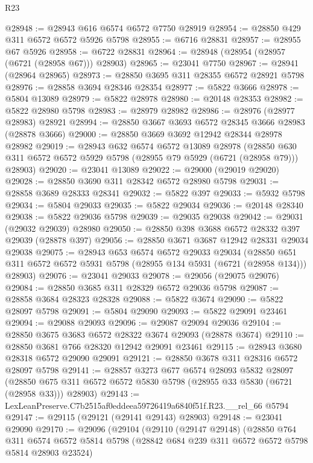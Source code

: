 \begin{lexlean}{R23}
\begin{coremodule}
@28948 := @28943 @616 @6574 @6572 @7750 @28919
@28954 := @28850 @429 @311 @6572 @6572 @5926 @5798
@28955 := @6716 @28831
@28957 := @28955 @67 @5926
@28958 := @6722 @28831
@28964 := @28948 (@28954 (@28957 (@6721 (@28958 @67))) @28903)
@28965 := @23041 @7750
@28967 := @28941 (@28964 @28965)
@28973 := @28850 @3695 @311 @28355 @6572 @28921 @5798
@28976 := @28858 @3694 @28346 @28354
@28977 := @5822 @3666
@28978 := @5804 @13089
@28979 := @5822 @28978
@28980 := @20148 @28353
@28982 := @5822 @28980 @5798
@28983 := @28979 @28982
@28986 := @28976 (@28977 @28983) @28921
@28994 := @28850 @3667 @3693 @6572 @28345 @3666 @28983 (@28878 @3666)
@29000 := @28850 @3669 @3692 @12942 @28344 @28978 @28982
@29019 := @28943
    @632
    @6574
    @6572
    @13089
    @28978
    (@28850 @630 @311 @6572 @6572 @5929 @5798 (@28955 @79 @5929 (@6721 (@28958 @79))) @28903)
@29020 := @23041 @13089
@29022 := @29000 (@29019 @29020)
@29028 := @28850 @3690 @311 @28342 @6572 @28980 @5798
@29031 := @28858 @3689 @28333 @28341
@29032 := @5822 @397
@29033 := @5932 @5798
@29034 := @5804 @29033
@29035 := @5822 @29034
@29036 := @20148 @28340
@29038 := @5822 @29036 @5798
@29039 := @29035 @29038
@29042 := @29031 (@29032 @29039) @28980
@29050 := @28850 @398 @3688 @6572 @28332 @397 @29039 (@28878 @397)
@29056 := @28850 @3671 @3687 @12942 @28331 @29034 @29038
@29075 := @28943
    @653
    @6574
    @6572
    @29033
    @29034
    (@28850 @651 @311 @6572 @6572 @5931 @5798 (@28955 @134 @5931 (@6721 (@28958 @134))) @28903)
@29076 := @23041 @29033
@29078 := @29056 (@29075 @29076)
@29084 := @28850 @3685 @311 @28329 @6572 @29036 @5798
@29087 := @28858 @3684 @28323 @28328
@29088 := @5822 @3674
@29090 := @5822 @28097 @5798
@29091 := @5804 @29090
@29093 := @5822 @29091 @23461
@29094 := @29088 @29093
@29096 := @29087 @29094 @29036
@29104 := @28850 @3675 @3683 @6572 @28322 @3674 @29093 (@28878 @3674)
@29110 := @28850 @3681 @766 @28320 @12942 @29091 @23461
@29115 := @28943 @3680 @28318 @6572 @29090 @29091
@29121 := @28850 @3678 @311 @28316 @6572 @28097 @5798
@29141 := @28857
    @3273
    @677
    @6574
    @28093
    @5832
    @28097
    (@28850 @675 @311 @6572 @6572 @5830 @5798 (@28955 @33 @5830 (@6721 (@28958 @33))) @28903)
@29143 := LexLeanPreserve.C7b2515af0eddeea59726419a6840f51f.R23.__rel_66 @5794
@29147 := @29115 (@29121 (@29141 @29143) @28903)
@29148 := @23041 @29090
@29170 := @29096
    (@29104
      (@29110
        (@29147 @29148)
        (@28850
          @764
          @311
          @6574
          @6572
          @5814
          @5798
          (@28842 @684 @239 @311 @6572 @6572 @5798 @5814 @28903 @23524)

\end{coremodule}
\end{lexlean}
